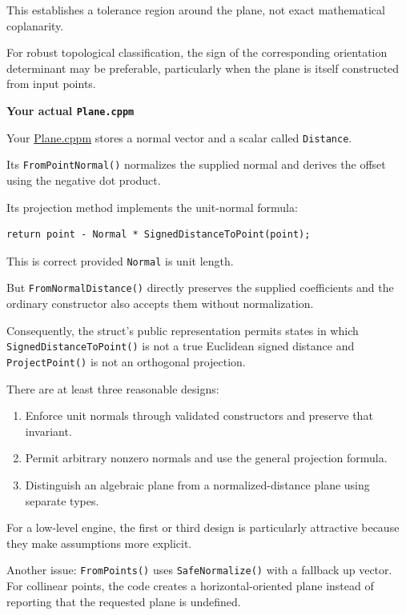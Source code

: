 This establishes a tolerance region around the plane, not exact mathematical coplanarity.

For robust topological classification, the sign of the corresponding orientation determinant may be preferable, particularly when the plane is itself constructed from input points.

\textbf{Your actual \texttt{Plane.cppm}}

Your \href{https://github.com/swayam8624/KairoGeometry/blob/master/Plane.cppm?utm_source=chatgpt.com}{Plane.cppm} stores a normal vector and a scalar called \texttt{Distance}.

Its \texttt{FromPointNormal()} normalizes the supplied normal and derives the offset using the negative dot product.

Its projection method implements the unit-normal formula:

\begin{verbatim}
return point - Normal * SignedDistanceToPoint(point);
\end{verbatim}

This is correct provided \texttt{Normal} is unit length.

But \texttt{FromNormalDistance()} directly preserves the supplied coefficients and the ordinary constructor also accepts them without normalization.

Consequently, the struct's public representation permits states in which \texttt{SignedDistanceToPoint()} is not a true Euclidean signed distance and \texttt{ProjectPoint()} is not an orthogonal projection.

There are at least three reasonable designs:

\begin{enumerate}
\def\labelenumi{\arabic{enumi}.}
\tightlist
\item
  Enforce unit normals through validated constructors and preserve that invariant.
\item
  Permit arbitrary nonzero normals and use the general projection formula.
\item
  Distinguish an algebraic plane from a normalized-distance plane using separate types.
\end{enumerate}

For a low-level engine, the first or third design is particularly attractive because they make assumptions more explicit.

Another issue: \texttt{FromPoints()} uses \texttt{SafeNormalize()} with a fallback up vector. For collinear points, the code creates a horizontal-oriented plane instead of reporting that the requested plane is undefined.

